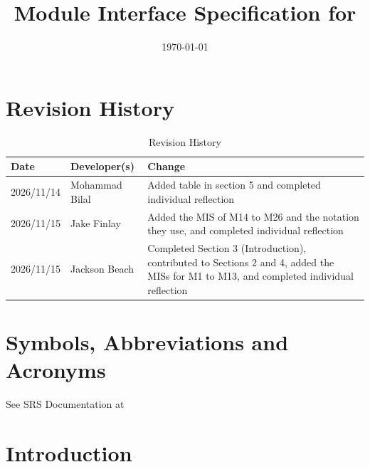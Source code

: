 \documentclass[10pt, titlepage]{article}
\begin{document}
\title{Module Interface Specification for \progname{}}

\author{\authname}

\date{\today}

\maketitle


\section{Revision History}

\begin{table}[!htbp]
\caption{Revision History} \label{TblRevisionHistory}
\begin{tabularx}{\textwidth}{llX}
\toprule
\textbf{Date} & \textbf{Developer(s)} & \textbf{Change}\\
\midrule
2026/11/14 & Mohammad Bilal & Added table in section 5 and completed individual reflection \\
2026/11/15 & Jake Finlay & Added the MIS of M14 to M26 and the notation they use, and completed individual reflection \\
2026/11/15 & Jackson Beach & Completed Section 3 (Introduction), contributed to Sections 2 and 4, added the MISs for M1 to M13, and completed individual reflection \\
\bottomrule
\end{tabularx}
\end{table}

\newpage

\tableofcontents


\newpage

\section{Symbols, Abbreviations and Acronyms}

See SRS Documentation at 


\newpage

\section{Introduction}
\end{document}
